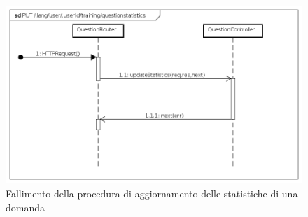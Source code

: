 \begin{itemize}
\begin{figure}[ht]
	\centering
	\includegraphics[scale=0.45]{UML/DiagrammiDiSequenza/Back-end/PUT__lang_user__userId_training_questionstatistics_failure.png}
	\caption{Fallimento della procedura di aggiornamento delle statistiche di una domanda}
\end{figure}
\FloatBarrier

\end{itemize} 







